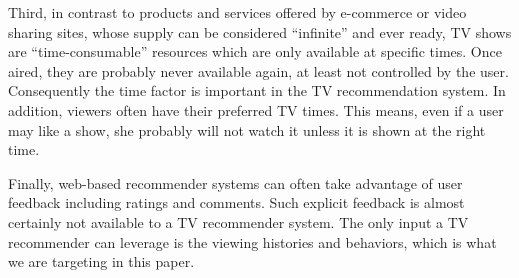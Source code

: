 Third, in contrast to products and services offered by e-commerce 
or video sharing sites, whose supply can be considered ``infinite''
and ever ready, TV shows are ``time-consumable'' resources which
are only available at specific times. Once aired, they are probably 
never available again, at least not controlled by the user. Consequently
the time factor is important in the TV recommendation system.
In addition, viewers often have their preferred TV times.
This means, even if a user may like a show, she probably will not
watch it unless it is shown at the right time.

Finally, web-based recommender systems can often take
advantage of user feedback including ratings and
comments. Such explicit feedback is almost certainly
not available to a TV recommender system. The only
input a TV recommender can leverage is the viewing histories
and behaviors, which is what we are targeting in this paper.





